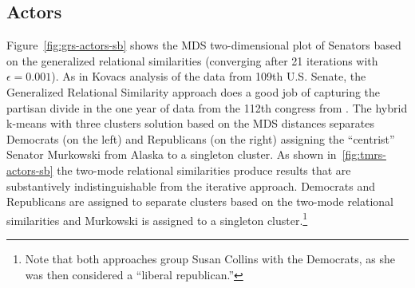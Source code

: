\documentclass[a4paper,fleqn]{cas-sc}
\begin{document}
\subsection{Actors}
Figure~\ref{fig:grs-actors-sb} shows the MDS two-dimensional plot of Senators based on the generalized relational similarities (converging after 21 iterations with $\epsilon = 0.001$). As in Kovacs analysis of the data from 109th U.S. Senate, the Generalized Relational Similarity approach does a good job of capturing the partisan divide in the one year of data from the 112th congress from \citet{knoke2021multimodal}. The hybrid k-means with three clusters solution based on the MDS distances separates Democrats (on the left) and Republicans (on the right) assigning the ``centrist'' Senator Murkowski from Alaska to a singleton cluster. As shown in~\ref{fig:tmrs-actors-sb} the two-mode relational similarities produce results that are substantively indistinguishable from the iterative approach. Democrats and Republicans are assigned to separate clusters based on the two-mode relational similarities and Murkowski is assigned to a singleton cluster.\footnote{Note that both approaches group Susan Collins with the Democrats, as she was then considered a ``liberal republican.''}
\end{document}
